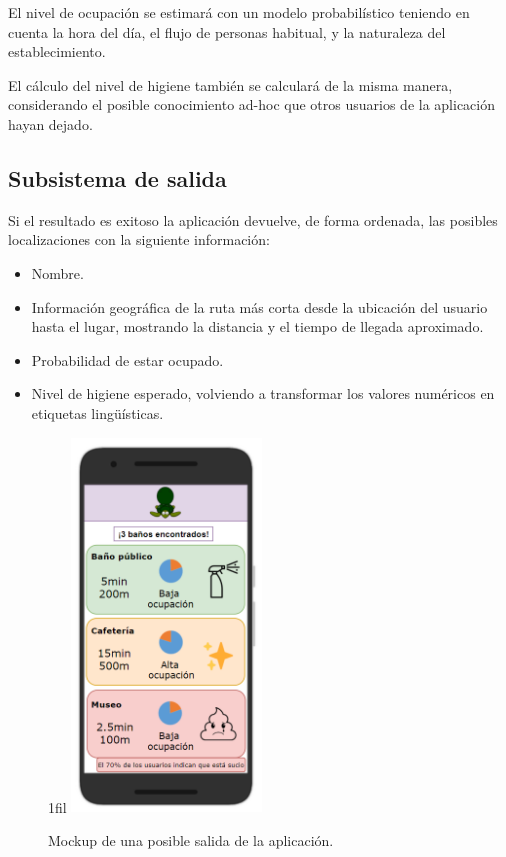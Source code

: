 \documentclass[13pt,a4paper]{article}
\makeatletter
\newcommand*{\centerfloat}{%
  \parindent \z@
  \leftskip \z@ \@plus 1fil \@minus \textwidth
  \rightskip\leftskip
  \parfillskip \z@skip}
\makeatother
\begin{document}
El nivel de ocupación se estimará con un modelo probabilístico teniendo en cuenta la hora del día, el flujo de personas habitual, y la naturaleza del establecimiento. 

El cálculo del nivel de higiene también se calculará de la misma manera, considerando el posible conocimiento ad-hoc que otros usuarios de la aplicación hayan dejado.

\subsection{Subsistema de salida}

Si el resultado es exitoso la aplicación devuelve, de forma ordenada, las posibles localizaciones con la siguiente información:

\begin{itemize}
  \item Nombre.
  \item Información geográfica de la ruta más corta desde la ubicación del usuario hasta el lugar, mostrando la distancia y el tiempo de llegada aproximado.
  \item Probabilidad de estar ocupado.
  \item Nivel de higiene esperado, volviendo a transformar los valores numéricos en etiquetas lingüísticas.
\end{itemize}


\begin{figure}[H]
  \centerfloat
  \includegraphics[width=0.45\textwidth]{img/4.png}
  \caption{Mockup de una posible salida de la aplicación.}
  \label{output}
\end{figure}
\end{document}
